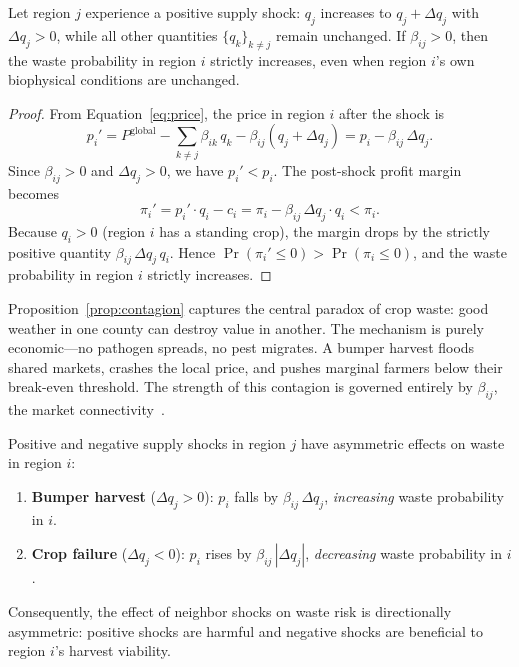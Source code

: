 \begin{proposition}
\label{prop:contagion}
Let region $j$ experience a positive supply shock: $q_j$ increases to $q_j + \Delta q_j$ with $\Delta q_j > 0$, while all other quantities $\{q_k\}_{k \neq j}$ remain unchanged.
If $\beta_{ij} > 0$, then the waste probability in region $i$ strictly increases, even when region $i$'s own biophysical conditions are unchanged.
\end{proposition}

\begin{proof}
From Equation~\eqref{eq:price}, the price in region $i$ after the shock is
\[
p_i' = P^{\mathrm{global}} - \sum_{k \neq j} \beta_{ik}\, q_k - \beta_{ij}(q_j + \Delta q_j) = p_i - \beta_{ij}\, \Delta q_j.
\]
Since $\beta_{ij} > 0$ and $\Delta q_j > 0$, we have $p_i' < p_i$.
The post-shock profit margin becomes
\[
\pi_i' = p_i' \cdot q_i - c_i = \pi_i - \beta_{ij}\, \Delta q_j \cdot q_i < \pi_i.
\]
Because $q_i > 0$ (region $i$ has a standing crop), the margin drops by the strictly positive quantity $\beta_{ij}\, \Delta q_j \, q_i$.
Hence $\Pr(\pi_i' \leq 0) > \Pr(\pi_i \leq 0)$, and the waste probability in region $i$ strictly increases.
\end{proof}

Proposition~\ref{prop:contagion} captures the central paradox of crop waste: good weather in one county can destroy value in another.
The mechanism is purely economic---no pathogen spreads, no pest migrates.
A bumper harvest floods shared markets, crashes the local price, and pushes marginal farmers below their break-even threshold.
The strength of this contagion is governed entirely by $\beta_{ij}$, the market connectivity~\citep{acemoglu2015systemic}.

\begin{corollary}
\label{cor:asymmetry}
Positive and negative supply shocks in region $j$ have asymmetric effects on waste in region $i$:
\begin{enumerate}[label=(\alph*)]
    \item \textbf{Bumper harvest} ($\Delta q_j > 0$): $p_i$ falls by $\beta_{ij}\, \Delta q_j$, \emph{increasing} waste probability in $i$.
    \item \textbf{Crop failure} ($\Delta q_j < 0$): $p_i$ rises by $\beta_{ij}\, |\Delta q_j|$, \emph{decreasing} waste probability in $i$.
\end{enumerate}
Consequently, the effect of neighbor shocks on waste risk is directionally asymmetric: positive shocks are harmful and negative shocks are beneficial to region $i$'s harvest viability.
\end{corollary}

